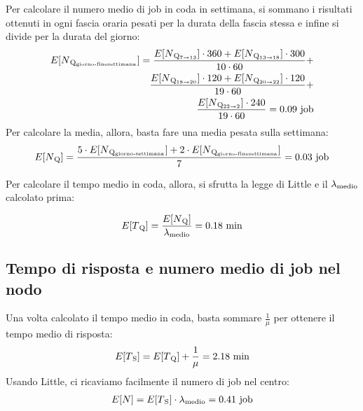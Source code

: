 \documentclass[a4paper, 12pt]{article}
\begin{document}
Per calcolare il numero medio di job in coda in settimana, si sommano i risultati ottenuti
in ogni fascia oraria pesati per la durata della fascia stessa e infine si
divide per la durata del giorno:
\[
\begin{aligned}
\begin{split}
  E[N\textsubscript{Q\textsubscript{giorno-finesettimana}}] = \frac{E[N\textsubscript{Q\textsubscript{7$\rightarrow$13}}] \cdot 360
+ E[N\textsubscript{Q\textsubscript{13$\rightarrow$18}}] \cdot 300}{10 \cdot 60} + \\
\frac{E[N\textsubscript{Q\textsubscript{18$\rightarrow$20}}] \cdot 120
+ E[N\textsubscript{Q\textsubscript{20$\rightarrow$22}}] \cdot 120}{19 \cdot 60} + \\
\frac{E[N\textsubscript{Q\textsubscript{22$\rightarrow$2}}] \cdot 240}{19 \cdot 60} = 0.09 \text{ job}
\end{split}
\end{aligned}
\]
\bigskip
Per calcolare la media, allora, basta fare una media pesata sulla settimana:
\[
\begin{aligned}
  E[N\textsubscript{Q}] = \frac{5 \cdot
E[N\textsubscript{Q\textsubscript{giorno-settimana}}] + 2 \cdot
E[N\textsubscript{Q\textsubscript{giorno-finesettimana}}]}{7} = 0.03 \text{ job}
\end{aligned}
\]

Per calcolare il tempo medio in coda, allora, si sfrutta la legge di Little
e il $\lambda\textsubscript{medio}$ calcolato prima:

\[
\begin{aligned}
  E[T\textsubscript{Q}] = \frac{E[N\textsubscript{Q}]}{\lambda\textsubscript{medio}} = 0.18
\text{ min} 
\end{aligned}
\]
  

\subsection{Tempo di risposta e numero medio di job nel nodo}
Una volta calcolato il tempo medio in coda, basta sommare $\frac{1}{\mu}$ per
ottenere il tempo medio di risposta:
\[
\begin{aligned}
  E[T\textsubscript{S}] = E[T\textsubscript{Q}] + \frac{1}{\mu} = 2.18
\text{ min} 
\end{aligned}
\]
Usando Little, ci ricaviamo facilmente il numero di job nel centro:
\[
\begin{aligned}
  E[N] = E[T\textsubscript{S}] \cdot \lambda\textsubscript{medio} = 0.41
\text{ job}
\end{aligned}
\]
\end{document}
